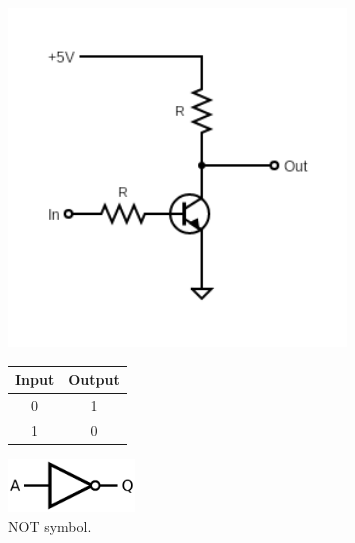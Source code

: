     \begin{figure}[H]
        \begin{minipage}{0.5\textwidth}
            \centering
            \includegraphics[width=0.8\textwidth]{figures/circuits/NOT.png}
            \label{fig:NOT_circuit} 
        \end{minipage}
        \begin{minipage}{0.5\textwidth}
            \centering
            \begin{tabular}{|c|c|}
                \hline
                Input & Output \\
                \hline
                0 & 1 \\
                1 & 0 \\
                \hline
            \end{tabular}
            \label{tab:NOT_table}
        \end{minipage}
    \end{figure}

    \begin{figure}[H]
	    \centering
	    \includegraphics[width=0.3\textwidth]{figures/symbols/NOT.png}
	    \caption{NOT symbol.}
	    \label{fig:NOT_sym} 
	\end{figure}

